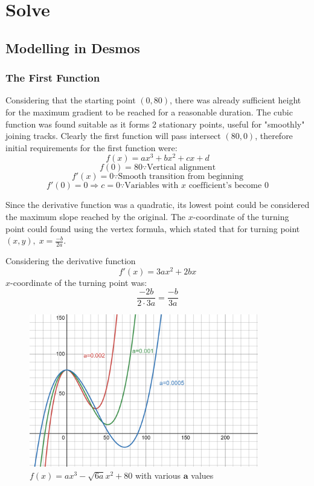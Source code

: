 \documentclass[11pt, letterpaper]{article}
\begin{document}
\section{Solve}
\subsection{Modelling in Desmos}
\subsubsection{The First Function}

Considering that the starting point $(0, 80)$, there was already sufficient height for the maximum gradient to be reached for a reasonable duration.
The cubic function was found suitable as it forms 2 stationary points, useful for "smoothly" joining tracks.
Clearly the first function will pass intersect  $(80, 0)$, therefore initial requirements for the first function were:
$$f(x)=ax^3 +bx^2 +cx +d$$
$$f(0)=80\because\textrm{Vertical alignment}$$
$$f'(x)=0 \because \textrm{Smooth transition from beginning}$$
$$f'(0)=0\Rightarrow c=0\because \textrm{Variables with } x \textrm{ coefficient's become 0}$$

Since the derivative function was a quadratic, its lowest point could be considered the maximum slope reached by the original.
The $x$-coordinate of the turning point could found using the vertex formula, which stated that for turning point $(x, y),\; x=\frac{-b}{2a}$.

Considering the derivative function
 $$f'(x)=3ax^2+2bx$$
 $x$-coordinate of the turning point was: 
 $$\frac{-2b}{2\cdot3a}=\frac{-b}{3a}$$



\begin{figure}[h!]
	\centering
	\includegraphics[width=10cm]{Eaxmple Cubic.png}
	\caption{$f(x)=ax^{3}-\sqrt{6a}x^{2}+80$ with various $\mathbf{a}$ values}
\end{figure}
\end{document}
